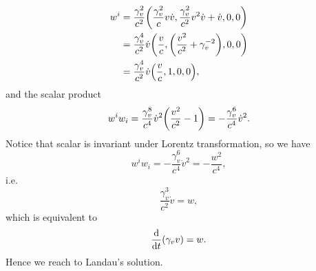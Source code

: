 \documentclass[10pt]{article}
\begin{document}
\begin{enumerate}
	\begin{align*}
		w^i &= \frac{\gamma_v^2}{c^2} \qty(\frac{\gamma_v^2}{c} v \dot{v}, \frac{\gamma_v^2}{c^2} v^2 \dot{v} + \dot{v}, 0, 0) \\
		&= \frac{\gamma_v^4}{c^2} \dot{v} \qty(\frac{v}{c}, \qty(\frac{v^2}{c^2} + \gamma_v^{-2}),0,0) \\
		&= \frac{\gamma_v^4}{c^2} \dot{v} \qty(\frac{v}{c}, 1,0,0),
	\end{align*}
	and the scalar product
	\begin{equation}
		w^i w_i = \frac{\gamma_v^8}{c^4}\dot{v}^2 \qty(\frac{v^2}{c^2} - 1) = -\frac{\gamma_v^6}{c^4}\dot{v}^2.
	\end{equation}
	Notice that scalar is invariant under Lorentz transformation, so we have
	\begin{equation}
		w^i w_i = -\frac{\gamma_v^6}{c^4}\dot{v}^2 = - \frac{w^2}{c^4},
	\end{equation}
	i.e.
	\begin{equation}
		\frac{\gamma_v^3}{c^2}\dot{v} = w,
	\end{equation}
	which is equivalent to
	\begin{equation}
		\dv{t} \qty(\gamma_v v) = w.
	\end{equation}
	Hence we reach to Landau's solution.


\end{enumerate}
\end{document}
